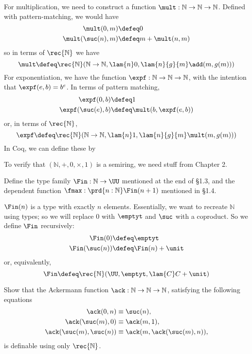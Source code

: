 \soln For multiplication, we need to construct a function $\mult : \mathbb{N}
\to \mathbb{N} \to \mathbb{N}$.  Defined with pattern-matching, we would have
\begin{align*}
  \mult(0, m) &\defeq 0 \\
  \mult(\suc(n), m) &\defeq m + \mult(n, m)
\end{align*}
so in terms of $\rec{\mathbb{N}}$ we have
\[
  \mult \defeq 
  \rec{\mathbb{N}}(
  \mathbb{N} \to \mathbb{N},
  \lam{n}0,
  \lam{n}{g}{m}\add(m, g(m))
  )
\]
For exponentiation, we have the function $\expf: \mathbb{N} \to \mathbb{N} \to
\mathbb{N}$, with the intention that $\expf(e, b) = b^{e}$.  In terms of pattern
matching,
\begin{align*}
  \expf(0, b) &\defeq 1 \\
  \expf(\suc(e), b) &\defeq \mult(b, \expf(e, b))
\end{align*}
or, in terms of $\rec{\mathbb{N}}$,
\[
  \expf \defeq \rec{\mathbb{N}}(
    \mathbb{N} \to \mathbb{N},
    \lam{n}1,
    \lam{n}{g}{m}\mult(m, g(m))
  )
\]
In Coq, we can define these by

To verify that $(\mathbb{N}, +, 0, \times, 1)$ is a semiring, we need stuff
from Chapter 2.


  Define the type family $\Fin : \mathbb{N} \to \UU$
mentioned at the end of \S1.3, and the dependent function $\fmax :
\prd{n : \mathbb{N}} \Fin(n + 1)$ mentioned in \S1.4.

\soln  $\Fin(n)$ is a type with exactly $n$ elements.  Essentially, we want to
recreate $\mathbb{N}$ using types; so we will replace $0$ with $\emptyt$ and
$\suc$ with a coproduct.  So we define $\Fin$ recursively:
\begin{align*}
  \Fin(0) &\defeq \emptyt \\
  \Fin(\suc(n)) &\defeq \Fin(n) + \unit
\end{align*}
or, equivalently,
\[
  \Fin \defeq \rec{\mathbb{N}}(\UU, \emptyt, \lam{C}C+\unit)
\]




  Show that the Ackermann function $\ack : \mathbb{N} \to
\mathbb{N} \to \mathbb{N}$,
satisfying the following equations
\begin{align*}
  \ack(0, n) &\equiv \suc(n), \\
  \ack(\suc(m), 0) &\equiv \ack(m, 1), \\
  \ack(\suc(m), \suc(n)) &\equiv \ack(m, \ack(\suc(m), n)),
\end{align*}
is definable using only $\rec{\mathbb{N}}$.

